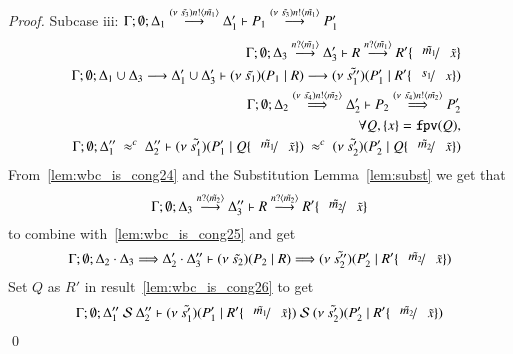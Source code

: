 \begin{proof}
	\noi Subcase iii: $\Gamma; \emptyset; \Delta_1 \stackrel{(\nu\ \tilde{s_3}) n ! \langle \tilde{m_1} \rangle}{\longrightarrow} \Delta_1' \vdash P_1 \stackrel{(\nu\ \tilde{s_3}) n ! \langle \tilde{m_1} \rangle}{\longrightarrow} P_1'$
%
	\begin{eqnarray}
		& & \Gamma; \emptyset; \Delta_3 \by{\bactinp{n}{\tilde{m_1}}} \Delta_3' \proves R \by{\bactinp{n}{\tilde{m_1}}} R' \subst{\tilde{m_1}}{\tilde{x}}
		\label{lem:wbc_is_cong24}\\
		& & \Gamma; \emptyset; \Delta_1 \cup \Delta_3 \by{} \Delta_1' \cup \Delta_3' \proves \newsp{\tilde{s_1}}{P_1 \Par R} \by{} \newsp{\tilde{s_1''}}{P_1' \Par R' \subst{s_1}{x}}
		\nonumber \\
		& & \Gamma; \emptyset; \Delta_2\By{\news{\tilde{s_4}} \bactout{n}{\tilde{m_2}}} \Delta_2' \proves P_2 \By{\news{\tilde{s_4}} \bactout{n}{\tilde{m_2}}} P_2'
		\label{lem:wbc_is_cong25}\\
		& & \forall Q, \set{x} = \fpv{Q}, \nonumber \\
		& & \Gamma; \emptyset; \Delta_1''\ \wbc\ \Delta_2'' \proves \newsp{\tilde{s_1'}}{P_1' \Par Q \subst{\tilde{m_1}}{\tilde{x}}}\ \wbc\ \newsp{\tilde{s_2'}}{P_2' \Par Q \subst{\tilde{m_2}}{\tilde{x}}} \label{lem:wbc_is_cong26}
	\end{eqnarray}
%
	From~\ref{lem:wbc_is_cong24} and the Substitution Lemma~\ref{lem:subst} we get that
	\[
		\Gamma; \emptyset; \Delta_3 \by{\bactinp{n}{\tilde{m_2}}} \Delta_3'' \proves R \by{\bactinp{n}{\tilde{m_2}}} R' \subst{\tilde{m_2}}{\tilde{x}}
	\]
	\noi to combine with~\ref{lem:wbc_is_cong25} and get
	\[
		\Gamma; \emptyset; \Delta_2 \cat \Delta_3 \By{} \Delta_2' \cat \Delta_3'' \proves \newsp{\tilde{s_2}}{P_2 \Par R} \By{} \newsp{\tilde{s_2''}}{P_2' \Par R' \subst{\tilde{m_2}}{\tilde{x}}}
	\]
%
	\noi Set $Q$ as $R'$ in result~\ref{lem:wbc_is_cong26} to get
%
	\[
		\Gamma; \emptyset; \Delta_1''\ \mathcal{S}\ \Delta_2'' \proves \newsp{\tilde{s_1'}}{P_1' \Par R' \subst{\tilde{m_1}}{\tilde{x}}}\ \mathcal{S}\ \newsp{\tilde{s_2'}}{P_2' \Par R' \subst{\tilde{m_2}}{\tilde{x}}}
	\]
	\qed
\end{proof}


